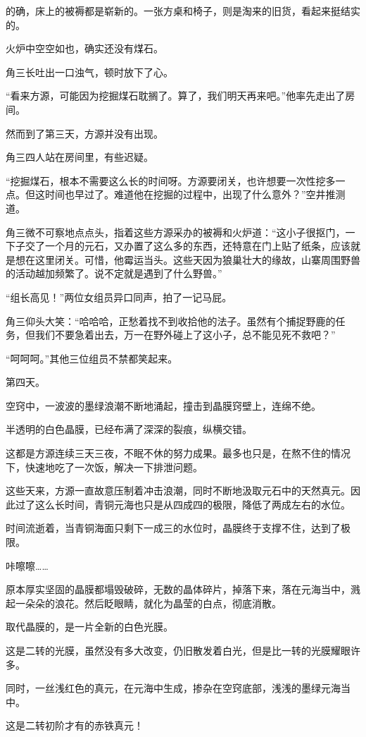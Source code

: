 \begin{this_body}
的确，床上的被褥都是崭新的。一张方桌和椅子，则是淘来的旧货，看起来挺结实的。

火炉中空空如也，确实还没有煤石。

角三长吐出一口浊气，顿时放下了心。

“看来方源，可能因为挖掘煤石耽搁了。算了，我们明天再来吧。”他率先走出了房间。

然而到了第三天，方源并没有出现。

角三四人站在房间里，有些迟疑。

“挖掘煤石，根本不需要这么长的时间呀。方源要闭关，也许想要一次性挖多一点。但这时间也早过了。难道他在挖掘的过程中，出现了什么意外？”空井推测道。

角三微不可察地点点头，指着这些方源采办的被褥和火炉道：“这小子很抠门，一下子交了一个月的元石，又办置了这么多的东西，还特意在门上贴了纸条，应该就是想在这里闭关。可惜，他霉运当头。这些天因为狼巢壮大的缘故，山寨周围野兽的活动越加频繁了。说不定就是遇到了什么野兽。”

“组长高见！”两位女组员异口同声，拍了一记马屁。

角三仰头大笑：“哈哈哈，正愁着找不到收拾他的法子。虽然有个捕捉野鹿的任务，但我们不要急着出去，万一在野外碰上了这小子，总不能见死不救吧？”

“呵呵呵。”其他三位组员不禁都笑起来。

第四天。

空窍中，一波波的墨绿浪潮不断地涌起，撞击到晶膜窍壁上，连绵不绝。

半透明的白色晶膜，已经布满了深深的裂痕，纵横交错。

这都是方源连续三天三夜，不眠不休的努力成果。最多也只是，在熬不住的情况下，快速地吃了一次饭，解决一下排泄问题。

这些天来，方源一直故意压制着冲击浪潮，同时不断地汲取元石中的天然真元。因此过了这么长时间，青铜元海也只是从四成四的极限，降低了两成左右的水位。

时间流逝着，当青铜海面只剩下一成三的水位时，晶膜终于支撑不住，达到了极限。

咔嚓嚓……

原本厚实坚固的晶膜都塌毁破碎，无数的晶体碎片，掉落下来，落在元海当中，溅起一朵朵的浪花。然后眨眼睛，就化为晶莹的白点，彻底消散。

取代晶膜的，是一片全新的白色光膜。

这是二转的光膜，虽然没有多大改变，仍旧散发着白光，但是比一转的光膜耀眼许多。

同时，一丝浅红色的真元，在元海中生成，掺杂在空窍底部，浅浅的墨绿元海当中。

这是二转初阶才有的赤铁真元！


\end{this_body}
